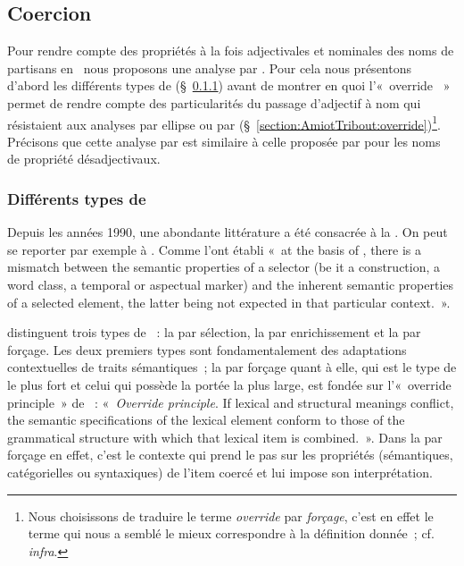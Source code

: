 \documentclass[output=paper]{LSP/langsci}
\begin{document}
\subsection{Coercion} \label{section:AmiotTribout:coercion}
Pour rendre compte des propriétés à la fois adjectivales et nominales des noms de partisans en \iste\ nous proposons une analyse par . Pour cela nous présentons d'abord les différents types de  (§~\ref{section:AmiotTribout:types-coercion}) avant de montrer en quoi l'«~override ~» permet de rendre compte des particularités du passage d'adjectif à nom qui résistaient aux analyses par ellipse ou par   (§~\ref{section:AmiotTribout:override})\footnote{Nous choisissons de  traduire le terme \textit{override} par \textit{forçage}, c'est en effet le terme qui nous a semblé le mieux correspondre à la définition donnée~; cf. \textit{infra}.}. Précisons que cette analyse par  est similaire à celle proposée par \cite{lauwers08, lauwers14b} pour les noms de propriété désadjectivaux.

\subsubsection{Différents types de }
\label{section:AmiotTribout:types-coercion}
\largerpage

Depuis les années 1990, une abondante littérature a été consacrée à la . On peut se reporter par exemple à \citep{pustejovsky91, jackendoff97, michaelis03, francismichaelis03, lauwerswillems11}. Comme l'ont établi \citep[1219]{lauwerswillems11} «~at the basis of , there is a mismatch %
\citep[cf.][]{francismichaelis03} %
%
between the semantic properties of a selector (be it a construction, a word class, a temporal or aspectual marker) and the inherent semantic properties of a selected element, the latter being not expected in that particular context.~».

\cite{audringbooij16} distinguent trois types de ~: la  par sélection, la  par enrichissement et la  par forçage.
Les deux premiers types sont fondamentalement des adaptations contextuelles de traits sémantiques~; la  par forçage quant à elle, qui est le type de  le plus fort et celui qui possède la portée la plus large, est fondée sur l'«~override principle~» de \citep[9]{michaelis03}~: «~\textit{Override principle}. If lexical and structural meanings conflict, the semantic specifications of the lexical element conform to those of the grammatical structure with which that lexical item is combined.~».
Dans la  par forçage en effet, c'est le contexte qui prend le pas sur les propriétés (sémantiques, catégorielles ou syntaxiques) de l'item coercé et lui impose son interprétation.
\end{document}
